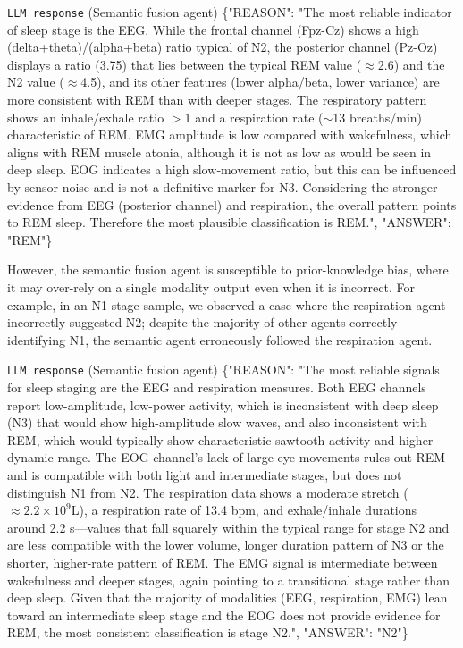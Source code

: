 \begin{promptbox}{\texttt{LLM response} (Semantic fusion agent)}
\{"REASON": "The most reliable indicator of sleep stage is the EEG. While the frontal channel (Fpz-Cz) shows a high (delta+theta)/(alpha+beta) ratio typical of N2, the posterior channel (Pz-Oz) displays a ratio (3.75) that lies between the typical REM value ($\approx$2.6) and the N2 value ($\approx$4.5), and its other features (lower alpha/beta, lower variance) are more consistent with REM than with deeper stages. The respiratory pattern shows an inhale/exhale ratio $>$1 and a respiration rate ($\sim$13 breaths/min) characteristic of REM. EMG amplitude is low compared with wakefulness, which aligns with REM muscle atonia, although it is not as low as would be seen in deep sleep. EOG indicates a high slow‑movement ratio, but this can be influenced by sensor noise and is not a definitive marker for N3. Considering the stronger evidence from EEG (posterior channel) and respiration, the overall pattern points to REM sleep. Therefore the most plausible classification is REM.", "ANSWER": "REM"\}
\end{promptbox}

However, the semantic fusion agent is susceptible to prior-knowledge bias, where it may over-rely on a single modality output even when it is incorrect. For example, in an N1 stage sample, we observed a case where the respiration agent incorrectly suggested N2; despite the majority of other agents correctly identifying N1, the semantic agent erroneously followed the respiration agent.

\begin{promptbox}{\texttt{LLM response} (Semantic fusion agent)}
\{"REASON": "The most reliable signals for sleep staging are the EEG and respiration measures. Both EEG channels report low-amplitude, low-power activity, which is inconsistent with deep sleep (N3) that would show high-amplitude slow waves, and also inconsistent with REM, which would typically show characteristic sawtooth activity and higher dynamic range. The EOG channel's lack of large eye movements rules out REM and is compatible with both light and intermediate stages, but does not distinguish N1 from N2. The respiration data shows a moderate stretch ($\approx 2.2 \times 10^9$L), a respiration rate of 13.4 bpm, and exhale/inhale durations around 2.2 s---values that fall squarely within the typical range for stage N2 and are less compatible with the lower volume, longer duration pattern of N3 or the shorter, higher-rate pattern of REM. The EMG signal is intermediate between wakefulness and deeper stages, again pointing to a transitional stage rather than deep sleep. Given that the majority of modalities (EEG, respiration, EMG) lean toward an intermediate sleep stage and the EOG does not provide evidence for REM, the most consistent classification is stage N2.", "ANSWER": "N2"\}
\end{promptbox}

